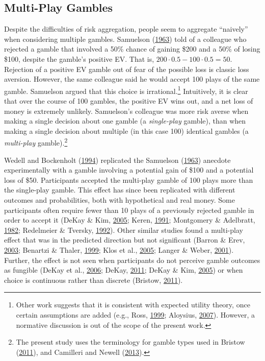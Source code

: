 \documentclass[
  english,
  man, donotrepeattitle,floatsintext]{apa7}
\theoremstyle{definition}
\theoremstyle{definition}
\theoremstyle{definition}
\theoremstyle{definition}
\theoremstyle{remark}
\begin{document}
\hypertarget{multi-play-gambles}{%
\subsection{Multi-Play Gambles}\label{multi-play-gambles}}

Despite the difficulties of risk aggregation, people seem to aggregate ``naively''
when considering multiple gambles. Samuelson (\protect\hyperlink{ref-samuelson1963}{1963}) told of a colleague who
rejected a gamble that involved a 50\% chance of gaining \$200 and a 50\% of losing
\$100, despite the gamble's positive EV. That is, \(200 \cdot 0.5 - 100 \cdot 0.5 = 50\). Rejection of a positive EV gamble out of fear of the possible loss is
classic loss aversion. However, the same colleague said he would accept 100
plays of the same gamble. Samuelson argued that this choice is
irrational.\footnote{Other work suggests that it is consistent with expected utility
  theory, once certain assumptions are added (e.g., Ross, \protect\hyperlink{ref-ross1999}{1999}; Aloysius, \protect\hyperlink{ref-aloysius2007}{2007}).
  However, a normative discussion is out of the scope of the present work.} Intuitively, it is clear that over the course of 100
gambles, the positive EV wins out, and a net loss of money is extremely
unlikely. Samuelson's colleague was more risk averse when making a single
decision about one gamble (a \emph{single-play} gamble), than when making a single
decision about multiple (in this case 100) identical gambles (a \emph{multi-play}
gamble).\footnote{The present study uses the terminology for gamble types used in
  Bristow (\protect\hyperlink{ref-bristow2011}{2011}), and Camilleri and Newell (\protect\hyperlink{ref-camilleri2013}{2013}).}

Wedell and Bockenholt (\protect\hyperlink{ref-wedell1994}{1994}) replicated the Samuelson (\protect\hyperlink{ref-samuelson1963}{1963}) anecdote experimentally with a gamble
involving a potential gain of \$100 and a potential loss of \$50. Participants
accepted the multi-play gamble of 100 plays more than the single-play gamble.
This effect has since been replicated with different outcomes and probabilities,
both with hypothetical and real money. Some participants often require fewer
than 10 plays of a previously rejected gamble in order to accept it (DeKay \& Kim, \protect\hyperlink{ref-dekay2005}{2005}; Keren, \protect\hyperlink{ref-keren1991}{1991}; Montgomery \& Adelbratt, \protect\hyperlink{ref-montgomery1982}{1982}; Redelmeier \& Tversky, \protect\hyperlink{ref-redelmeier1992}{1992}). Other similar studies found a
multi-play effect that was in the predicted direction but not significant
(Barron \& Erev, \protect\hyperlink{ref-barron2003}{2003}; Benartzi \& Thaler, \protect\hyperlink{ref-benartzi1999}{1999}; Klos et al., \protect\hyperlink{ref-klos2005}{2005}; Langer \& Weber, \protect\hyperlink{ref-langer2001}{2001}). Further, the effect is not
seen when participants do not perceive gamble outcomes as fungible (DeKay et al., \protect\hyperlink{ref-dekay2006}{2006}; DeKay, \protect\hyperlink{ref-dekay2011}{2011}; DeKay \& Kim, \protect\hyperlink{ref-dekay2005}{2005}) or when choice is continuous rather than discrete
(Bristow, \protect\hyperlink{ref-bristow2011}{2011}).
\end{document}
